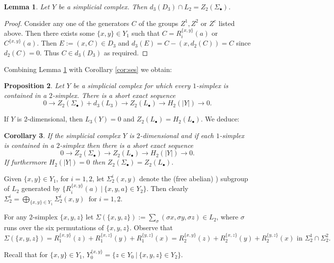 \documentclass[12pt]{amsart}
\newtheorem{lem}{Lemma}[section]
\newtheorem{prop}[lem]{Proposition}
\newtheorem{cor}[lem]{Corollary}
\theoremstyle{definition}
\newcommand{\<}{\langle}
\renewcommand{\>}{\rangle}
\begin{document}
\begin{lem}\label{lem:d3} Let $Y$ be a simplicial complex. Then $d_3(D_3)\cap L_2=Z_2(\Sigma_\bullet)$.
\end{lem}

\begin{proof}
Consider any one of the generators $C$  of the groups $Z^1,Z^2$ or $Z^c$ listed above. Then there exists some $\{ x,y\}\in Y_1$ such that $C=R_i^{\{ x,y\}}(a)$ or $C^{\{ x,y\}}(a)$. Then 
$E:=(x,C)\in D_3$ and $d_3(E)=C-(x,d_2(C))=C$ since $d_2(C)=0$. Thus $C\in d_3(D_3)$ as required. 
\end{proof}
Combining Lemma \ref{lem:d3} with Corollary \ref{cor:ses} we obtain:
\begin{prop} \label{prop:z2}
Let $Y$ be a simplicial complex for which every $1$-simplex is contained in a $2$-simplex. There is a short exact sequence
\[
0\to Z_2(\Sigma_\bullet)+d_3(L_3)\to Z_2(L_\bullet)\to H_2(|Y|)\to 0.
\]
\end{prop}

If $Y$ is $2$-dimensional, then $L_3(Y)=0$ and $Z_2(L_\bullet)=H_2(L_\bullet)$. We deduce:
\begin{cor} \label{cor:2dim}
If the simplicial complex $Y$ is $2$-dimensional and if each $1$-simplex is contained in a $2$-simplex then there is a short exact sequence 
\[
0\to Z_2(\Sigma_\bullet)\to Z_2(L_\bullet)\to H_2(|Y|)\to 0.
\]
If furthermore $H_2(|Y|)=0$ then $Z_2(\Sigma_\bullet)=Z_2(L_\bullet)$.
\end{cor}

Given $\{ x,y\}\in Y_1$, for $i=1,2$,  let $\Sigma_2^i(x,y)$ denote the (free abelian) ) subgroup of $L_2$ generated by $\{ R_i^{\{ x,y\}}(a)\ |\   \{ x,y,a\}\in Y_2\}$. Then clearly 
$
\Sigma_2^i=\bigoplus_{\{ x,y\}\in Y_1}\Sigma_2^i(x,y)\ \mbox{ for }i=1,2.
$

  For any $2$-simplex $\{ x,y,z\}$ let $\Sigma(\{ x,y,z\}):= \sum_{\sigma}(\sigma x,\sigma y, \sigma z)\in L_2$, where $\sigma$ runs over the six permutations of $\{ x,y,z\}$. Observe that
\[
\Sigma(\{ x,y,z\})= R_1^{\{ x,y\}}(z)+R_1^{\{ x,z\}}(y)+R_1^{\{ y,z\}}(x) =  R_2^{\{ x,y\}}(z)+R_2^{\{ x,z\}}(y)+R_2^{\{ y,z\}}(x)\mbox{ in }\Sigma_2^1\cap\Sigma_2^2.
\]


 Recall that for $\{ x,y\}\in Y_1$,  $Y^{\{ x,y\}}_0=\{ z\in Y_0\ |\ \{ x,y,z\}\in Y_2\}$.
\end{document}
